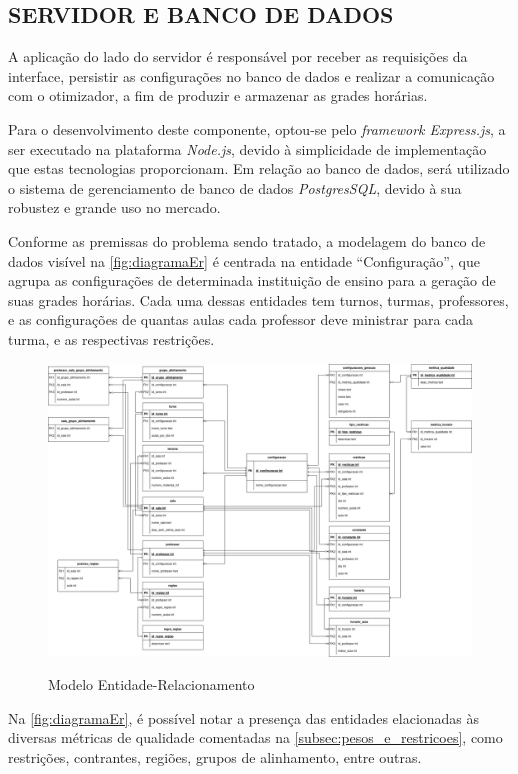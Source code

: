 \subsection{SERVIDOR E BANCO DE DADOS}

A aplicação do lado do servidor é responsável por receber as requisições da interface, persistir as configurações no banco de dados e realizar a comunicação com o otimizador, a fim de produzir e armazenar as grades horárias.

Para o desenvolvimento deste componente, optou-se pelo \textit{framework Express.js}, a ser executado na plataforma \textit{Node.js}, devido à simplicidade de implementação que estas tecnologias proporcionam. Em relação ao banco de dados, será utilizado o sistema de gerenciamento de banco de dados \textit{PostgresSQL}, devido à sua robustez e grande uso no mercado.

Conforme as premissas do problema sendo tratado, a modelagem do banco de dados visível na \autoref{fig:diagramaEr} é centrada na entidade ``Configuração'', que agrupa as configurações de determinada instituição de ensino para a geração de suas grades horárias. Cada uma dessas entidades tem turnos, turmas, professores, e as configurações de quantas aulas cada professor deve ministrar para cada turma, e as respectivas restrições.

\begin{figure}[!htb]
	\centering
	\caption{Modelo Entidade-Relacionamento}
	\includegraphics[width=1\textwidth]{./dados/figuras/ER_horario_INCREMENTO3}
	\label{fig:diagramaEr}
\end{figure}
\newpage

Na \autoref{fig:diagramaEr}, é possível notar a presença das entidades elacionadas às diversas métricas de qualidade comentadas na \autoref{subsec:pesos_e_restricoes}, como restrições, contrantes, regiões, grupos de alinhamento, entre outras.

